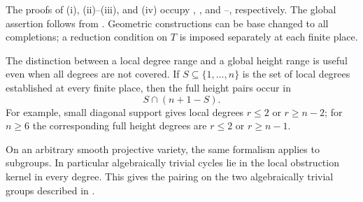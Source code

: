 The proofs of (i), (ii)--(iii), and (iv) occupy
, , and
--, respectively. The global
assertion follows from . Geometric constructions
can be base changed to all completions; a reduction condition on $T$ is
imposed separately at each finite place.

The distinction between a local degree range and a global height range
is useful even when all degrees are not covered. If $S\subseteq
\{1,\ldots,n\}$ is the set of local degrees established at every finite
place, then the full height pairs occur in
\begin{equation}\label{eq:range-intersection}
 S\cap(n+1-S).
\end{equation}
For example, small diagonal support gives local degrees $r\leq2$ or
$r\geq n-2$; for $n\geq6$ the corresponding full height degrees are
$r\leq2$ or $r\geq n-1$.

On an arbitrary smooth projective variety, the same formalism applies
to subgroups. In particular algebraically trivial cycles lie in the
local obstruction kernel in every degree. This gives the pairing on
the two algebraically trivial groups described in
.
